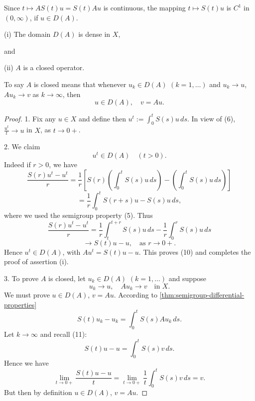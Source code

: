 \begin{remark}
\label{rem:semigroup-c1-remark}
Since $t \mapsto AS(t)u = S(t)Au$ is continuous, the mapping $t \mapsto S(t)u$ is $C^1$ in $(0, \infty)$, if $u \in D(A)$.
\end{remark}

\begin{theorem}
\label{thm:semigroup-generator-properties}
(i) The domain $D(A)$ is dense in $X$,

and

(ii) $A$ is a closed operator.
\end{theorem}

\begin{remark}
\label{rem:closed-operator-definition}
To say $A$ is closed means that whenever $u_k \in D(A)$ $(k = 1, \ldots)$ and $u_k \to u$, $Au_k \to v$ as $k \to \infty$, then
\[
u \in D(A), \quad v = Au.
\]
\end{remark}

\begin{proof}
1. Fix any $u \in X$ and define then $u^t := \int_0^t S(s)u\,ds$. In view of (6), $\frac{u^t}{t} \to u$ in $X$, as $t \to 0+$.

2. We claim
\[
u^t \in D(A) \quad (t > 0).
\tag{10}
\]
Indeed if $r > 0$, we have
\[
\frac{S(r)u^t - u^t}{r} = \frac{1}{r}\left[S(r)\left(\int_0^t S(s)u\,ds\right) - \left(\int_0^t S(s)u\,ds\right)\right]
\]
\[
= \frac{1}{r}\int_0^t S(r+s)u - S(s)u\,ds,
\]
where we used the semigroup property (5). Thus
\[
\frac{S(r)u^t - u^t}{r} = \frac{1}{r}\int_t^{t+r} S(s)u\,ds - \frac{1}{r}\int_0^r S(s)u\,ds
\]
\[
\to S(t)u - u, \quad \text{as } r \to 0+.
\]
Hence $u^t \in D(A)$, with $Au^t = S(t)u - u$. This proves (10) and completes the proof of assertion (i).

3. To prove $A$ is closed, let $u_k \in D(A)$ $(k = 1, \ldots)$ and suppose
\[
u_k \to u, \quad Au_k \to v \quad \text{in } X.
\tag{11}
\]
We must prove $u \in D(A)$, $v = Au$. According to \cref{thm:semigroup-differential-properties}
\[
S(t)u_k - u_k = \int_0^t S(s)Au_k\,ds.
\]
Let $k \to \infty$ and recall (11):
\[
S(t)u - u = \int_0^t S(s)v\,ds.
\]
Hence we have
\[
\lim_{t \to 0+} \frac{S(t)u - u}{t} = \lim_{t \to 0+} \frac{1}{t}\int_0^t S(s)v\,ds = v.
\]
But then by definition $u \in D(A)$, $v = Au$.
\end{proof}

